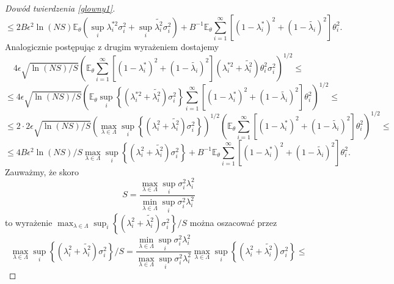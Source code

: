 \documentclass{mwart}
\begin{document}
\begin{proof}[Dowód twierdzenia \ref{glowny1}]
\begin{displaymath}
\leq 2B\epsilon^2 \ln (NS)\mathbb{E}_{\theta}\left(\sup_i\lambda_i^{*2}\sigma_i^2+\sup_i\tilde{\lambda_i^2}\sigma_i^2\right)+B^{-1}\mathbb{E}_{\theta}\sum_{i=1}^{\infty}[(1-\lambda_i^*)^2+(1-\tilde{\lambda_i})^2]\theta_i^2.
\end{displaymath}
Analogicznie postępując z drugim wyrażeniem dostajemy
\begin{displaymath}
4\epsilon\sqrt{\ln (NS)/S}\left(\mathbb{E}_{\theta}\sum_{i=1}^{\infty}[(1-\lambda_i^*)^2+(1-\tilde{\lambda_i})^2](\lambda_i^{*2}+\tilde{\lambda_i^2})\theta_i^2\sigma_i^2\right)^{1/2}\leq
\end{displaymath}
\begin{displaymath}
\leq 4\epsilon\sqrt{\ln (NS)/S}\left(\mathbb{E}_{\theta}\sup_i\left\{(\lambda_i^{*2}+\tilde{\lambda_i^2})\sigma_i^2\right\}\sum_{i=1}^{\infty}[(1-\lambda_i^*)^2+(1-\tilde{\lambda_i})^2]\theta_i^2\right)^{1/2}\leq
\end{displaymath}
\begin{displaymath}
\leq 2\cdot 2\epsilon\sqrt{\ln (NS)/S} \left(\max_{\lambda\in \Lambda}\sup_i\left\{(\lambda_i^{2}+\tilde{\lambda_i^2})\sigma_i^2\right\}\right)^{1/2}\left(\mathbb{E}_{\theta}\sum_{i=1}^{\infty}[(1-\lambda_i^*)^2+(1-\tilde{\lambda_i})^2]\theta_i^2\right)^{1/2}\leq
\end{displaymath}
\begin{displaymath}
\leq 4B\epsilon^2\ln (NS)/S\max_{\lambda\in \Lambda}\sup_i\left\{(\lambda_i^{2}+\tilde{\lambda_i^2})\sigma_i^2\right\}+B^{-1}\mathbb{E}_{\theta}\sum_{i=1}^{\infty}[(1-\lambda_i^*)^2+(1-\tilde{\lambda_i})^2]\theta_i^2.
\end{displaymath}
Zauważmy, że skoro
\begin{displaymath}
S=\frac{\max_{\lambda\in\Lambda}\sup_i\sigma_i^2\lambda_i^2}{\min_{\lambda\in\Lambda}\sup_i\sigma_i^2\lambda_i^2}
\end{displaymath}
to wyrażenie $\max_{\lambda\in \Lambda}\sup_i\left\{(\lambda_i^{2}+\tilde{\lambda_i^2})\sigma_i^2\right\}/S$ można oszacować przez
\begin{displaymath}
\max_{\lambda\in \Lambda}\sup_i\left\{(\lambda_i^{2}+\tilde{\lambda_i^2})\sigma_i^2\right\}/S=\frac{\min_{\lambda\in\Lambda}\sup_i\sigma_i^2\lambda_i^2}{\max_{\lambda\in\Lambda}\sup_i\sigma_i^2\lambda_i^2}\max_{\lambda\in \Lambda}\sup_i\left\{(\lambda_i^{2}+\tilde{\lambda_i^2})\sigma_i^2\right\}\leq
\end{displaymath}
\begin{displaymath}

\end{displaymath}
\end{proof}
\end{document}
